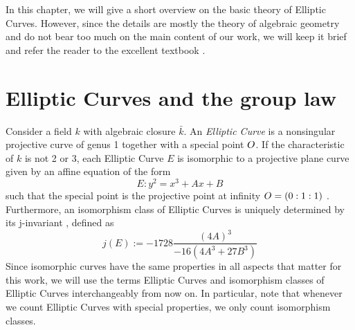 
In this chapter, we will give a short overview on the basic theory of Elliptic Curves.
However, since the details are mostly the theory of algebraic geometry and do not bear too much on the main content of our work, we will keep it brief and refer the reader to the excellent textbook \cite{arithmetic_elliptic_curves}.

\section{Elliptic Curves and the group law}
Consider a field $k$ with algebraic closure $\bar{k}$.
An \emph{Elliptic Curve} is a nonsingular projective curve of genus 1 together with a special point $O$.
If the characteristic of $k$ is not 2 or 3, each Elliptic Curve $E$ is isomorphic to a projective plane curve given by an affine equation of the form
\begin{equation*}
    E: y^2 = x^3 + Ax + B
\end{equation*}
such that the special point is the projective point at infinity $O = (0 : 1 : 1)$ \cite[Prop.~III.3.1]{arithmetic_elliptic_curves}.
Furthermore, an isomorphism class of Elliptic Curves is uniquely determined by its j-invariant \cite[Prop.~III.1.4]{arithmetic_elliptic_curves}, defined as
\begin{equation*}
    j(E) := -1728 \frac {(4A)^3} {-16(4A^3 + 27B^3)}
\end{equation*}
Since isomorphic curves have the same properties in all aspects that matter for this work, we will use the terms Elliptic Curves and isomorphism classes of Elliptic Curves interchangeably from now on.
In particular, note that whenever we count Elliptic Curves with special properties, we only count isomorphism classes. 

